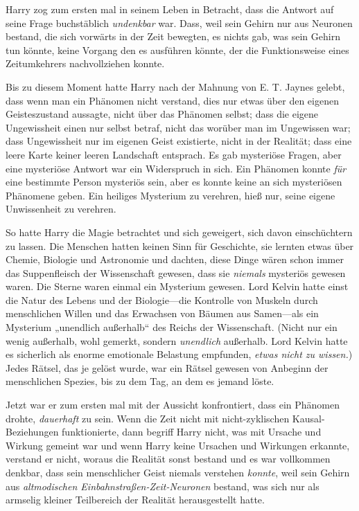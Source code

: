 {Harry zog zum ersten mal in seinem Leben in Betracht, dass die Antwort auf seine Frage buchstäblich \emph{undenkbar} war. Dass, weil sein Gehirn nur aus Neuronen bestand, die sich vorwärts in der Zeit bewegten, es nichts gab, was sein Gehirn tun könnte, keine Vorgang den es ausführen könnte, der die Funktionsweise eines Zeitumkehrers nachvollziehen konnte.

Bis zu diesem Moment hatte Harry nach der Mahnung von E. T. Jaynes gelebt, dass wenn man ein Phänomen nicht verstand, dies nur etwas über den eigenen Geisteszustand aussagte, nicht über das Phänomen selbst; dass die eigene Ungewissheit einen nur selbst betraf, nicht das worüber man im Ungewissen war; dass Ungewissheit nur im eigenen Geist existierte, nicht in der Realität; dass eine leere Karte keiner leeren Landschaft entsprach. Es gab mysteriöse Fragen, aber eine mysteriöse Antwort war ein Widerspruch in sich. Ein Phänomen konnte \emph{für} eine bestimmte Person mysteriös sein, aber es konnte keine an sich mysteriösen Phänomene geben. Ein heiliges Mysterium zu verehren, hieß nur, seine eigene Unwissenheit zu verehren.

So hatte Harry die Magie betrachtet und sich geweigert, sich davon einschüchtern zu lassen. Die Menschen hatten keinen Sinn für Geschichte, sie lernten etwas über Chemie, Biologie und Astronomie und dachten, diese Dinge wären schon immer das Suppenfleisch der Wissenschaft gewesen, dass sie \emph{niemals} mysteriös gewesen waren. Die Sterne waren einmal ein Mysterium gewesen. Lord Kelvin hatte einst die Natur des Lebens und der Biologie—die Kontrolle von Muskeln durch menschlichen Willen und das Erwachsen von Bäumen aus Samen—als ein Mysterium „unendlich außerhalb“ des Reichs der Wissenschaft. (Nicht nur ein wenig außerhalb, wohl gemerkt, sondern \emph{unendlich} außerhalb. Lord Kelvin hatte es sicherlich als enorme emotionale Belastung empfunden, \emph{etwas nicht zu wissen.}) Jedes Rätsel, das je gelöst wurde, war ein Rätsel gewesen von Anbeginn der menschlichen Spezies, bis zu dem Tag, an dem es jemand löste.

Jetzt war er zum ersten mal mit der Aussicht konfrontiert, dass ein Phänomen drohte, \emph{dauerhaft} zu sein. Wenn die Zeit nicht mit nicht-zyklischen Kausal-Beziehungen funktionierte, dann begriff Harry nicht, was mit Ursache und Wirkung gemeint war und wenn Harry keine Ursachen und Wirkungen erkannte, verstand er nicht, woraus die Realität sonst bestand und es war vollkommen denkbar, dass sein menschlicher Geist niemals verstehen \emph{konnte}, weil sein Gehirn aus \emph{altmodischen Einbahnstraßen-Zeit-Neuronen} bestand, was sich nur als armselig kleiner Teilbereich der Realität herausgestellt hatte.

}

